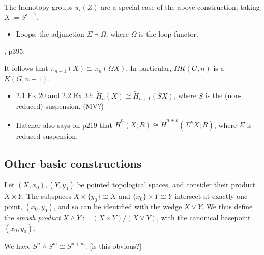 \documentclass{MetricNotes2023}
\begin{document}
\begin{remark}\label{2502200937}
The homotopy groups \(\pi_i(Z)\) are a special case of the above construction, taking \(X:=S^{i-1}\). 
\end{remark}


\begin{itemize}
\item Loops; the adjunction \(\Sigma \dashv \Omega\), where \(\Omega\) is the loop functor.
\end{itemize}

\autocite{hatcher}, p395:

\begin{remark}
It follows that \(\pi_{n+1}(X)\cong \pi_n(\Omega X)\). In particular, \(\Omega K(G, n)\) is a \newline\(K(G, n-1)\). 
\end{remark}

\begin{itemize}
\item \autocite{hatcher} 2.1 Ex 20 and 2.2 Ex 32: \(\tilde H_n(X)\cong \tilde H_{n+1}(SX)\), where \(S\) is the (non-reduced) suspension.  (MV?) 
\item Hatcher also says on p219 that \(\tilde H^n(X;R)\cong \tilde H^{n+k}(\Sigma^kX;R)\), where \(\Sigma \) is reduced suspension.
\end{itemize}

\subsection{Other basic constructions}

\begin{definition}
Let \((X, x_0), (Y, y_0)\) be pointed topological spaces, and consider their product \(X\times Y\). The subspaces \(X\times\{y_0\}\cong X\) and \(\{x_0\}\times Y\cong Y\) intersect at exactly one point, \((x_0, y_0)\), and so can be identified with the wedge \(X\vee Y\). We thus define the \textit{smash product} \(X\wedge Y:=(X\times Y)/(X\vee Y)\), with the canonical basepoint \((x_0,y_0)\).  
\end{definition}

\begin{example}
We have \(S^n \wedge S^m\cong S^{n+m}\). [is this obvious?]
\end{example}
\end{document}

